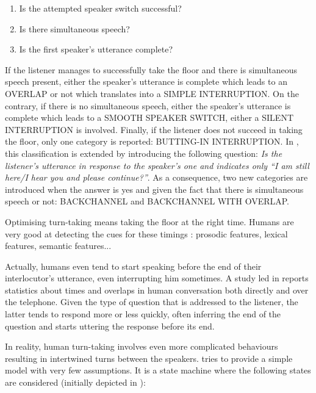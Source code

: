         \begin{enumerate}
            \item Is the attempted speaker switch successful?
            \item Is there simultaneous speech?
            \item Is the first speaker's utterance complete?
        \end{enumerate}
        
        If the listener manages to successfully take the floor and there is simultaneous speech present, either the speaker's utterance is complete which leads to an OVERLAP or not which translates into a SIMPLE INTERRUPTION. On the contrary, if there is no simultaneous speech, either the speaker's utterance is complete which leads to a SMOOTH SPEAKER SWITCH, either a SILENT INTERRUPTION is involved. Finally, if the listener does not succeed in taking the floor, only one category is reported: BUTTING-IN INTERRUPTION. In \cite{Gravano2011}, this classification is extended by introducing the following question: \textit{Is the listener's utterance in response to the speaker's one and indicates only ``I am still here/I hear you and please continue?''}. As a consequence, two new categories are introduced when the answer is yes and given the fact that there is simultaneous speech or not: BACKCHANNEL and BACKCHANNEL WITH OVERLAP.
        
        Optimising turn-taking means taking the floor at the right time. Humans are very good at detecting the cues for these timings \cite{Raux2008,Jonsdottir2008,Gravano2011}: prosodic features, lexical features, semantic features...

        Actually, humans even tend to start speaking before the end of their interlocutor's utterance, even interrupting him sometimes. A study led in \cite{Strombergsson2013} reports statistics about times and overlaps in human conversation both directly and over the telephone. Given the type of question that is addressed to the listener, the latter tends to respond more or less quickly, often inferring the end of the question and starts uttering the response before its end.
        
        In reality, human turn-taking involves even more complicated behaviours resulting in intertwined turns between the speakers. \cite{Raux2009} tries to provide a simple model with very few assumptions. It is a state machine where the following states are considered (initially depicted in \cite{Jaffe1970}):

